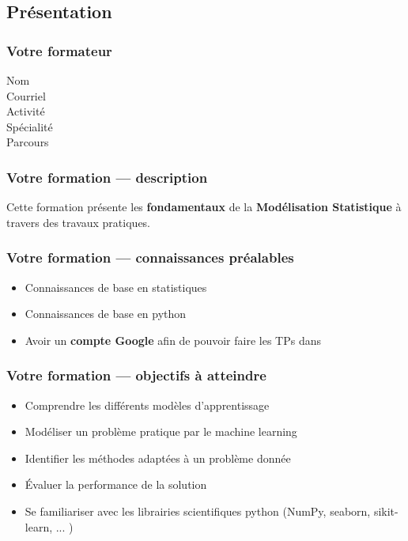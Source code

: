 \subsection{Présentation}

\begin{frame}
  \frametitle{Votre formateur}
  \begin{description}
  \item[Nom] \TrainerName
  \item[Courriel] \TrainerEmail
  \item[Activité] \TrainerActivity
  \item[Spécialité] \TrainerSpecialization
  \item[Parcours] \TrainerTraining
  \end{description}
\end{frame}

\begin{frame}
  \frametitle{Votre formation — description}
  Cette formation présente les \textbf{fondamentaux} de la \textbf{Modélisation Statistique} à travers des travaux pratiques. \\
\end{frame}

\begin{frame}
  \frametitle{Votre formation — connaissances préalables}
  \begin{itemize}
  \item Connaissances de base en statistiques
  \item Connaissances de base en python
  \item Avoir un \textbf{compte Google} afin de pouvoir faire les TPs dans 
  \end{itemize}
\end{frame}

\begin{frame}
  \frametitle{Votre formation — objectifs à atteindre}
  \begin{itemize}
  \item Comprendre les différents modèles d'apprentissage
  \item Modéliser un problème pratique par le machine learning
  \item Identifier les méthodes adaptées à un problème donnée
  \item Évaluer la performance de la solution
  \item Se familiariser avec les librairies scientifiques python (NumPy, seaborn, sikit-learn, ... )
  \end{itemize}
\end{frame}

